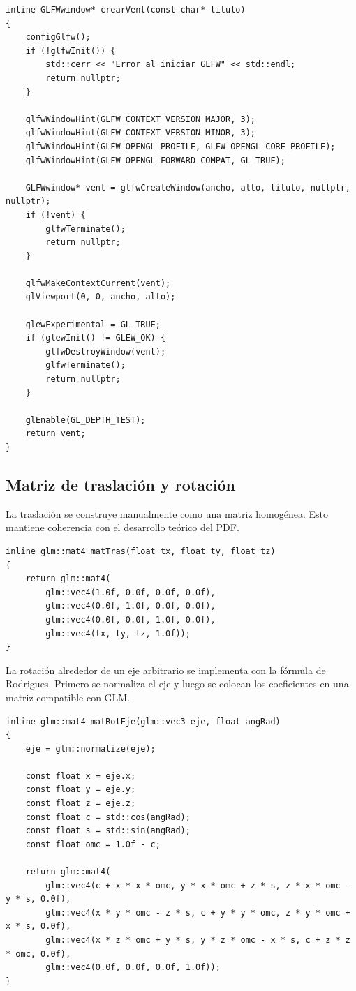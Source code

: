 \documentclass[12pt,a4paper]{article}
\begin{document}
\begin{lstlisting}[style=cxx,caption={Creacion de ventana moderna con GLFW y GLEW.}]
inline GLFWwindow* crearVent(const char* titulo)
{
    configGlfw();
    if (!glfwInit()) {
        std::cerr << "Error al iniciar GLFW" << std::endl;
        return nullptr;
    }

    glfwWindowHint(GLFW_CONTEXT_VERSION_MAJOR, 3);
    glfwWindowHint(GLFW_CONTEXT_VERSION_MINOR, 3);
    glfwWindowHint(GLFW_OPENGL_PROFILE, GLFW_OPENGL_CORE_PROFILE);
    glfwWindowHint(GLFW_OPENGL_FORWARD_COMPAT, GL_TRUE);

    GLFWwindow* vent = glfwCreateWindow(ancho, alto, titulo, nullptr, nullptr);
    if (!vent) {
        glfwTerminate();
        return nullptr;
    }

    glfwMakeContextCurrent(vent);
    glViewport(0, 0, ancho, alto);

    glewExperimental = GL_TRUE;
    if (glewInit() != GLEW_OK) {
        glfwDestroyWindow(vent);
        glfwTerminate();
        return nullptr;
    }

    glEnable(GL_DEPTH_TEST);
    return vent;
}
\end{lstlisting}

\subsection*{Matriz de traslaci\'on y rotaci\'on}
La traslaci\'on se construye manualmente como una matriz homog\'enea. Esto mantiene coherencia con el desarrollo te\'orico del PDF.

\begin{lstlisting}[style=cxx,caption={Matriz de traslacion manual.}]
inline glm::mat4 matTras(float tx, float ty, float tz)
{
    return glm::mat4(
        glm::vec4(1.0f, 0.0f, 0.0f, 0.0f),
        glm::vec4(0.0f, 1.0f, 0.0f, 0.0f),
        glm::vec4(0.0f, 0.0f, 1.0f, 0.0f),
        glm::vec4(tx, ty, tz, 1.0f));
}
\end{lstlisting}

La rotaci\'on alrededor de un eje arbitrario se implementa con la f\'ormula de Rodrigues. Primero se normaliza el eje y luego se colocan los coeficientes en una matriz compatible con GLM.

\begin{lstlisting}[style=cxx,caption={Rotacion alrededor de un eje arbitrario.}]
inline glm::mat4 matRotEje(glm::vec3 eje, float angRad)
{
    eje = glm::normalize(eje);

    const float x = eje.x;
    const float y = eje.y;
    const float z = eje.z;
    const float c = std::cos(angRad);
    const float s = std::sin(angRad);
    const float omc = 1.0f - c;

    return glm::mat4(
        glm::vec4(c + x * x * omc, y * x * omc + z * s, z * x * omc - y * s, 0.0f),
        glm::vec4(x * y * omc - z * s, c + y * y * omc, z * y * omc + x * s, 0.0f),
        glm::vec4(x * z * omc + y * s, y * z * omc - x * s, c + z * z * omc, 0.0f),
        glm::vec4(0.0f, 0.0f, 0.0f, 1.0f));
}
\end{lstlisting}
\end{document}
